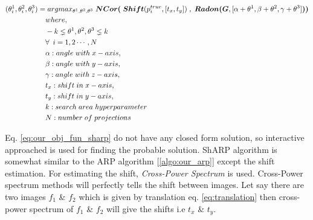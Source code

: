 \documentclass{report}
\begin{document}
\begin{equation}\label{eq:our_obj_fun_sharp}
  \begin{aligned}
    (\theta^1_i,\theta^2_i,\theta^3_i)  = & \hspace{0.1cm} argmax_{\theta^1,\theta^2,\theta^3} \hspace{0.1cm} \boldsymbol{NCor(}\hspace{0.1cm}\boldsymbol{Shift} ( p_i^{true} , [t_x,t_y])\hspace{0.1cm} , \hspace{0.1cm} \boldsymbol{Radon(G}, [ \alpha+\theta^1,\beta+\theta^2,\gamma+\theta^3 ] \boldsymbol{)} \boldsymbol{)}\\
    & where,\\
    &  -k \lneq \theta^1,\theta^2,\theta^3 \lneq k\\
    &  \forall \enspace i = 1,2 \cdots , N\\
    & \alpha : angle\hspace{0.1cm}with\hspace{0.1cm}x-axis,\\
    & \beta : angle\hspace{0.1cm}with\hspace{0.1cm}y-axis,\\
    & \gamma : angle\hspace{0.1cm}with\hspace{0.1cm}z-axis,\\
    & t_x : shift\hspace{0.1cm}in\hspace{0.1cm}x-axis,\\
    & t_y : shift\hspace{0.1cm}in\hspace{0.1cm}y-axis,\\
    &  k : search\hspace{0.1cm}area\hspace{0.1cm}hyperparameter \\
    & N: number\hspace{0.1cm}of\hspace{0.1cm}projections\\
  \end{aligned}
\end{equation}


Eq. \ref{eq:our_obj_fun_sharp} do not have any closed form solution, so interactive approached is used for finding the probable solution. ShARP algorithm is somewhat similar to the ARP algorithm [\ref{algo:our_arp}] except the shift estimation. For estimating the shift, \textit{Cross-Power Spectrum} \cite{reddy1996fft} is used. Cross-Power spectrum methods will perfectly tells the shift between images. Let say there are two  images ${f_1}$ \& ${f_2}$ which is given by translation eq. \ref{eq:translation} then cross-power spectrum of ${f_1}$ \& ${f_2}$ will give the shifts i.e ${t_x}$ \& ${t_y}$. 
\end{document}
